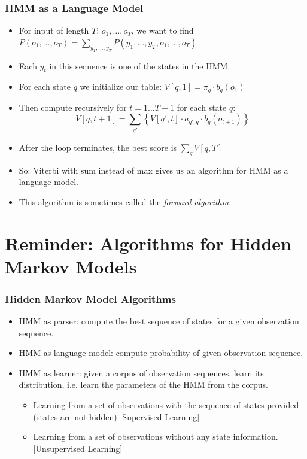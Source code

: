 \begin{frame}
\frametitle{HMM as a Language Model}
\begin{itemize}[<+->]
\item For input of length $T$: $o_1, \ldots, o_T$, we want to find $P(o_1, \ldots, o_T) = \sum_{y_1, \ldots, y_T} P(y_1, \ldots, y_T, o_1, \ldots, o_T)$ 
\item Each $y_t$ in this sequence is one of the states in the HMM.
\item For each state $q$ we initialize our table: $V[q,1] = \pi_q \cdot b_q(o_1)$ 
\item Then compute recursively for $t = 1 \ldots T-1$ for each state $q$:
\[ V[q, t+1] = \sum_{q'} \left\{ V[q', t] \cdot a_{q',q} \cdot b_q(o_{t+1}) \right\} \]
\item After the loop terminates, the best score is $\sum_q V[q,T]$
\item So: Viterbi with sum instead of max gives us an algorithm for HMM as a language model.
\item This algorithm is sometimes called the \emph{forward algorithm}.
\end{itemize}
\end{frame}


\section{Reminder: Algorithms for Hidden Markov Models}

\begin{frame}
\frametitle{Hidden Markov Model Algorithms}
\begin{itemize}
\item HMM as parser: compute the best sequence of states for a given observation sequence.
\item HMM as language model: compute probability of given observation sequence.
\item HMM as learner: given a corpus of observation sequences, learn its distribution, i.e. learn the parameters of the HMM from the corpus.
\begin{itemize}
\item Learning from a set of observations with the sequence of states provided (states are not hidden) {\color{blue} [Supervised Learning]}
\item Learning from a set of observations without any state information. {\color{blue} [Unsupervised Learning]}
\end{itemize}
\end{itemize}
\end{frame}

